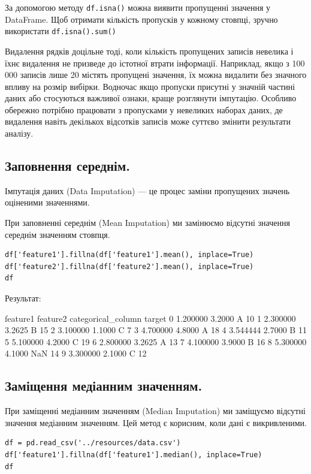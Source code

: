 За допомогою методу \verb|df.isna()| можна виявити пропущенні значення у DataFrame. Щоб отримати кількість пропусків у кожному стовпці, зручно використати \verb|df.isna().sum()|

 Видалення рядків доцільне тоді, коли кількість пропущених записів невелика і їхнє видалення не призведе до істотної втрати інформації. Наприклад, якщо з 100 000 записів лише 20 містять пропущені значення, їх можна видалити без значного впливу на розмір вибірки. Водночас якщо пропуски присутні у значній частині даних або стосуються важливої ознаки, краще розглянути імпутацію. Особливо обережно потрібно працювати з пропусками у невеликих наборах даних, де видалення навіть декількох відсотків записів може суттєво змінити результати аналізу.


\subsection{Заповнення середнім.} 

Імпутація даних (Data Imputation) — це процес заміни пропущених значень оціненими значеннями.

При заповненні середнім (Mean Imputation) ми замінюємо відсутні значення середнім значенням стовпця.

\begin{lstlisting}
df['feature1'].fillna(df['feature1'].mean(), inplace=True)
df['feature2'].fillna(df['feature2'].mean(), inplace=True)
df
\end{lstlisting}

Результат:

\begin{console}
feature1	feature2	categorical_column	target
0	1.200000	3.2000	A	10
1	2.300000	3.2625	B	15
2	3.100000	1.1000	C	7
3	4.700000	4.8000	A	18
4	3.544444	2.7000	B	11
5	5.100000	4.2000	C	19
6	2.800000	3.2625	A	13
7	4.100000	3.9000	B	16
8	5.300000	4.1000	NaN	14
9	3.300000	2.1000	C	12
\end{console}

\subsection{Заміщення медіанним значенням.} 

При заміщенні медіанним значенням (Median Imputation) ми заміщуємо відсутні значення медіанним значенням. 
Цей метод є корисним, коли дані є викривленими.

\begin{lstlisting}
df = pd.read_csv('../resources/data.csv')
df['feature1'].fillna(df['feature1'].median(), inplace=True)
df
\end{lstlisting}

